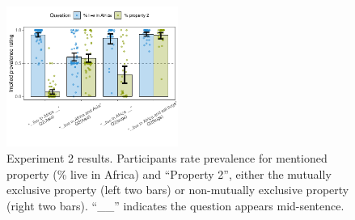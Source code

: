 \documentclass[10pt,letterpaper]{article}
\begin{document}
%
%

\begin{figure}[h]
  \centering
    \includegraphics[width=0.5\textwidth]{expt2_summary}
  \caption{Experiment 2 results.  Participants rate prevalence for mentioned property (\% live in Africa) and ``Property 2'', either the mutually exclusive property (left two bars) or non-mutually exclusive property (right two bars). ``\_\_'' indicates the question appears mid-sentence.}
  \label{fig:expt2}
  \end{figure}


\end{document}
